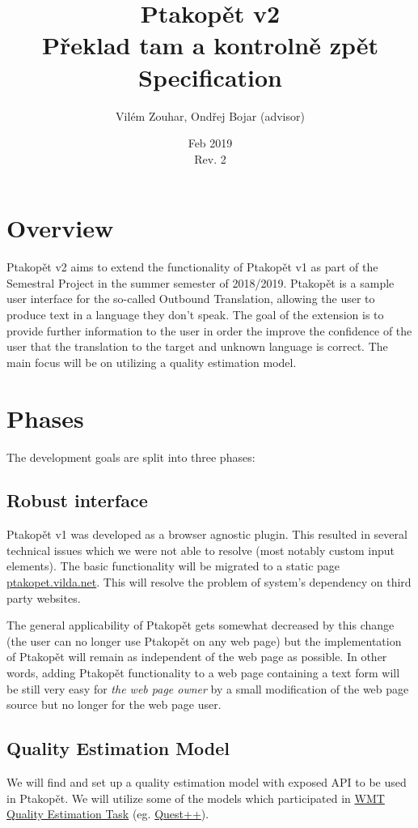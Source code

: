 \documentclass[a4paper]{article}
\begin{document}
\title{Ptakopět v2\\ \large Překlad tam a kontrolně zpět \\ \large Specification }
\author{Vilém Zouhar, Ondřej Bojar \small{(advisor)}}
\date{Feb 2019 \\ Rev. 2}
\maketitle 

\section{Overview}
Ptakopět v2 aims to extend the functionality of Ptakopět v1 as part of the Semestral Project in the summer semester of 2018/2019. Ptakopět is a sample user interface for the so-called Outbound Translation, allowing the user to produce text in a language they don't speak. The goal of the extension is to provide further information to the user in order the improve the confidence of the user that the translation to the target and unknown language is correct. The main focus will be on utilizing a quality estimation model.

\section{Phases}
The development goals are split into three phases:

\subsection{Robust interface}
Ptakopět v1 was developed as a browser agnostic plugin. This resulted in several technical issues which we were not able to resolve (most notably custom input elements). The basic functionality will be migrated to a static page \href{https://ptakopet.vilda.net}{ptakopet.vilda.net}. This will resolve the problem of system's dependency on third party websites.

The general applicability of Ptakopět gets somewhat decreased by this change (the user can no longer use Ptakopět on any web page) but the implementation of Ptakopět will remain as independent of the web page as possible. In other words, adding Ptakopět functionality to a web page containing a text form will be still very easy for \emph{the web page owner} by a small modification of the web page source but no longer for the web page user.

\subsection{Quality Estimation Model}
We will  find and set up a quality estimation model with exposed API to be used in Ptakopět. We will utilize some of the models which participated in \href{http://www.statmt.org/wmt18/quality-estimation-task.html}{WMT Quality Estimation Task} (eg. \href{https://github.com/ghpaetzold/questplusplus}{Quest++}).
\end{document}
